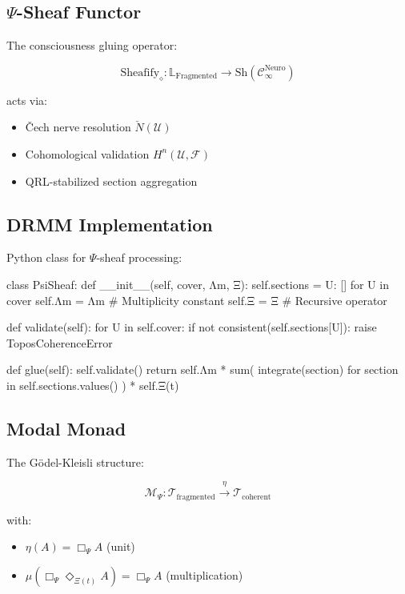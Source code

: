 \documentclass[12pt]{article}
\begin{document}
\begin{center}
\subsection{$\Psi$-Sheaf Functor}
\label{subsec:sheaf}

The consciousness gluing operator:

\[
\text{Sheafify}_\diamond : \mathbb{L}_{\text{Fragmented}} \rightarrow \text{Sh}(\mathcal{C}_{\infty}^{\text{Neuro}})
\]

acts via:
\begin{itemize}
    \item Čech nerve resolution $\check{N}(\mathcal{U})$
    \item Cohomological validation $H^n(\mathcal{U},\mathcal{F})$
    \item QRL-stabilized section aggregation
\end{itemize}

\subsection{DRMM Implementation}
\label{subsec:drmm}

Python class for $\Psi$-sheaf processing:

\begin{python}
class PsiSheaf:
    def __init__(self, cover, Λm, Ξ):
        self.sections = {U: [] for U in cover}
        self.Λm = Λm  # Multiplicity constant
        self.Ξ = Ξ    # Recursive operator
        
    def validate(self):
        for U in self.cover:
            if not consistent(self.sections[U]):
                raise ToposCoherenceError

    def glue(self):
        self.validate()
        return self.Λm * sum(
            integrate(section) 
            for section in self.sections.values()
        ) * self.Ξ(t)
\end{python}

\subsection{Modal Monad}
\label{subsec:monad}

The Gödel-Kleisli structure:

\[
\mathcal{M}_\Psi : \mathcal{T}_{\text{fragmented}} \xrightarrow{\eta} \mathcal{T}_{\text{coherent}}
\]

with:
\begin{itemize}
    \item $\eta(A) = \Box_\Psi A$ (unit)
    \item $\mu(\Box_\Psi \Diamond_{\Xi(t)} A) = \Box_\Psi A$ (multiplication)
\end{itemize}


\end{center}
\end{document}

